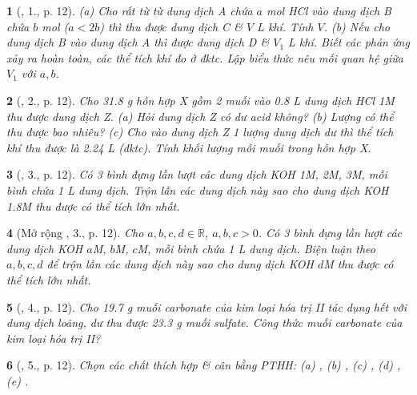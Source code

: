 \documentclass{article}
\newtheorem{baitoan}{}
\begin{document}

\begin{baitoan}[\cite{An_400_BT_Hoa_Hoc_9}, 1., p. 12]
	(a) Cho rất từ từ dung dịch A chứa $a$ {\rm mol HCl} vào dung dịch B chứa $b$ {\rm mol } ($a < 2b$) thì thu được dung dịch C \& $V$ {\rm L} khí. Tính $V$. (b) Nếu cho dung dịch B vào dung dịch A thì được dung dịch D \& $V_1$ {\rm L} khí. Biết các phản ứng xảy ra hoàn toàn, các thể tích khí đo ở đktc. Lập biểu thức nêu mối quan hệ giữa $V_1$ với $a,b$.
\end{baitoan}

\begin{baitoan}[\cite{An_400_BT_Hoa_Hoc_9}, 2., p. 12]
	Cho {\rm31.8 g} hỗn hợp X gồm 2 muối {\rm{}} vào {\rm0.8 L} dung dịch {\rm HCl 1M} thu được dung dịch Z. (a) Hỏi dung dịch Z có dư acid không? (b) Lượng {\rm{}} có thể thu được bao nhiêu? (c) Cho vào dung dịch Z 1 lượng dung dịch {\rm{}} dư thì thể tích khí {\rm{}} thu được là {\rm2.24 L} (đktc). Tính khối lượng mỗi muối trong hỗn hợp X.
\end{baitoan}

\begin{baitoan}[\cite{An_400_BT_Hoa_Hoc_9}, 3., p. 12]
	Có 3 bình đựng lần lượt các dung dịch {\rm KOH 1M, 2M, 3M}, mỗi bình chứa {\rm1 L} dung dịch. Trộn lẫn các dung dịch này sao cho dung dịch {\rm KOH 1.8M} thu được có thể tích lớn nhất.
\end{baitoan}

\begin{baitoan}[Mở rộng \cite{An_400_BT_Hoa_Hoc_9}, 3., p. 12]
	Cho $a,b,c,d\in\mathbb{R}$, $a,b,c > 0$. Có 3 bình đựng lần lượt các dung dịch {\rm KOH $a$M, $b$M, $c$M}, mỗi bình chứa {\rm1 L} dung dịch. Biện luận theo $a,b,c,d$ để trộn lẫn các dung dịch này sao cho dung dịch {\rm KOH $d$M} thu được có thể tích lớn nhất.
\end{baitoan}

\begin{baitoan}[\cite{An_400_BT_Hoa_Hoc_9}, 4., p. 12]
	Cho {\rm19.7 g} muối carbonate của kim loại hóa trị II tác dụng hết với dung dịch {\rm{}} loãng, dư thu được {\rm23.3 g} muối sulfate. Công thức muối carbonate của kim loại hóa trị II?
\end{baitoan}

\begin{baitoan}[\cite{An_400_BT_Hoa_Hoc_9}, 5., p. 12]
	Chọn các chất thích hợp \& cân bằng {\rm PTHH}: {\rm(a) , (b) , (c) , (d) , (e) }.
\end{baitoan}
\end{document}
